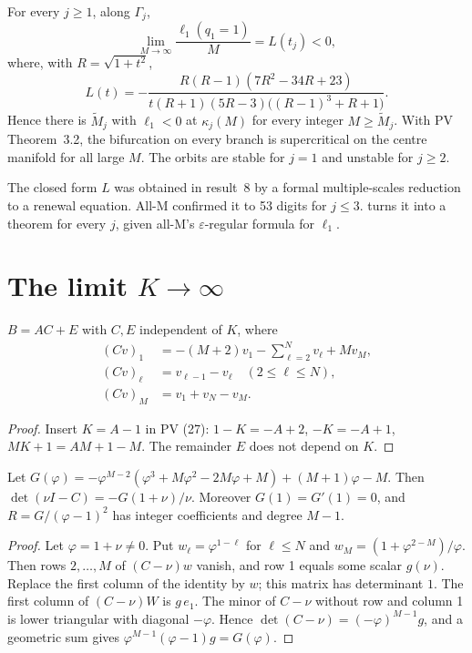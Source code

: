 \documentclass[11pt,a4paper]{report}
\begin{document}
\begin{theorem}[note={every branch, large \(M\)}]\label{thm:C}
For every \(j\ge1\), along \(\Gamma_j\),
\[\lim_{M\to\infty}\frac{\ell_1(q_1=1)}M=L(t_j)<0,\]
where, with \(R=\sqrt{1+t^2}\),
\[L(t)=-\frac{R(R-1)(7R^2-34R+23)}{t(R+1)(5R-3)\big((R-1)^3+R+1\big)}.\]
Hence there is \(\widetilde M_j\) with \(\ell_1<0\) at \(\kappa_j(M)\) for every integer \(M\ge\widetilde M_j\). With PV
Theorem~3.2, the bifurcation on every branch is supercritical on the centre manifold for all large \(M\). The orbits
are stable for \(j=1\) and unstable for \(j\ge2\).
\end{theorem}

The closed form \(L\) was obtained in result~8 by a formal multiple-scales reduction to a renewal equation. All-M
confirmed it to 53 digits for \(j\le3\).  turns it into a theorem for every \(j\), given all-M's
\(\varepsilon\)-regular formula for \(\ell_1\).

\section{The limit \texorpdfstring{\(K\to\infty\)}{K to infinity}}

\begin{lemma}\label{lem:split}
\(B=AC+E\) with \(C,E\) independent of \(K\), where
\begin{align*}
(Cv)_1&=-(M+2)v_1-\sum_{\ell=2}^{N}v_\ell+Mv_M,\\
(Cv)_\ell&=v_{\ell-1}-v_\ell\quad(2\le\ell\le N),\\
(Cv)_M&=v_1+v_N-v_M.
\end{align*}
\end{lemma}
\begin{proof}
Insert \(K=A-1\) in PV (27): \(1-K=-A+2\), \(-K=-A+1\), \(MK+1=AM+1-M\). The remainder \(E\) does not depend on \(K\).
\end{proof}

\begin{lemma}\label{lem:det}
Let \(G(\varphi)=-\varphi^{M-2}(\varphi^3+M\varphi^2-2M\varphi+M)+(M+1)\varphi-M\). Then
\(\det(\nu I-C)=-G(1+\nu)/\nu\). Moreover \(G(1)=G'(1)=0\), and \(R=G/(\varphi-1)^2\) has integer coefficients and
degree \(M-1\).
\end{lemma}
\begin{proof}
Let \(\varphi=1+\nu\ne0\). Put \(w_\ell=\varphi^{1-\ell}\) for \(\ell\le N\) and \(w_M=(1+\varphi^{2-M})/\varphi\). Then
rows \(2,\dots,M\) of \((C-\nu)w\) vanish, and row 1 equals some scalar \(g(\nu)\). Replace the first column of the
identity by \(w\); this matrix has determinant \(1\). The first column of \((C-\nu)W\) is \(g\,e_1\). The minor of
\(C-\nu\) without row and column 1 is lower triangular with diagonal \(-\varphi\). Hence
\(\det(C-\nu)=(-\varphi)^{M-1}g\), and a geometric sum gives \(\varphi^{M-1}(\varphi-1)g=G(\varphi)\).
\end{proof}
\end{document}
